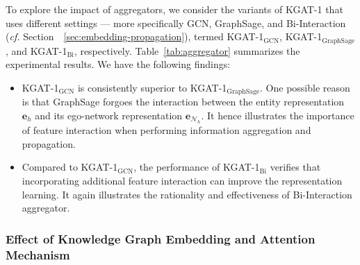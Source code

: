 \documentclass[sigconf]{acmart}
\newcommand{\Mat}[1]{\mathbf{#1}}
\newcommand{\Set}[1]{\mathcal{#1}}
\newcommand{\cf}{\emph{cf. }}
\theoremstyle{definition}
\begin{document}
To explore the impact of aggregators, we consider the variants of KGAT-1 that uses different settings --- more specifically GCN, GraphSage, and Bi-Interaction (\cf Section~~\ref{sec:embedding-propagation}), termed KGAT-1$_{\text{GCN}}$, KGAT-1$_{\text{GraphSage}}$, and KGAT-1$_{\text{Bi}}$, respectively.
Table~\ref{tab:aggregator} summarizes the experimental results.
We have the following findings:
\begin{itemize}[leftmargin=*]
    \item KGAT-1$_{\text{GCN}}$ is consistently superior to KGAT-1$_{\text{GraphSage}}$. One possible reason is that GraphSage forgoes the interaction between the entity representation $\Mat{e}_{h}$ and its ego-network representation $\Mat{e}_{\Set{N}_{h}}$. It hence illustrates the importance of feature interaction when performing information aggregation and propagation.
    
    \item Compared to KGAT-1$_{\text{GCN}}$, the performance of KGAT-1$_{\text{Bi}}$ verifies that incorporating additional feature interaction can improve the representation learning. It again illustrates the rationality and effectiveness of Bi-Interaction aggregator.
\end{itemize}


\subsubsection{\textbf{Effect of Knowledge Graph Embedding and Attention Mechanism}}\label{sec:ablation-study}




\begin{table}[t]
\caption{Effect of aggregators.}
\vspace{-10px}
\label{tab:aggregator}
\vspace{-10px}
\end{table}
\end{document}
